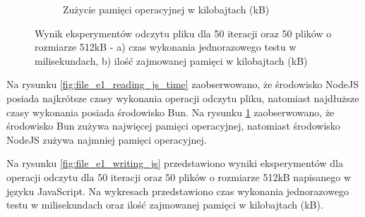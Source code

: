 \begin{figure}[H]
\begin{subfigure}[b]{0.42\textwidth}
    \caption{Zużycie pamięci operacyjnej w kilobajtach (kB)}
    \label{fig:file_e1_reading_js_memory}
  \end{subfigure}
  \caption{Wynik eksperymentów odczytu pliku dla 50 iteracji oraz 50 plików o rozmiarze 512kB - a) czas wykonania jednorazowego testu w milisekundach, b) ilość zajmowanej pamięci w kilobajtach (kB)}
  \label{fig:file_e1_reading_js}
\end{figure}

Na rysunku \ref{fig:file_e1_reading_js_time} zaobserwowano, że środowisko NodeJS posiada najkrótsze czasy wykonania operacji odczytu pliku, natomiast najdłuższe czasy wykonania posiada środowisko Bun. Na rysunku \ref{fig:file_e1_reading_js_memory} zaobserwowano, że środowisko Bun zużywa najwięcej pamięci operacyjnej, natomiast środowisko NodeJS zużywa najmniej pamięci operacyjnej.

Na rysunku \ref{fig:file_e1_writing_js} przedstawiono wyniki eksperymentów dla operacji odczytu dla 50 iteracji oraz 50 plików o rozmiarze 512kB napisanego w języku JavaScript. Na wykresach przedstawiono czas wykonania jednorazowego testu w milisekundach oraz ilość zajmowanej pamięci w kilobajtach (kB).

